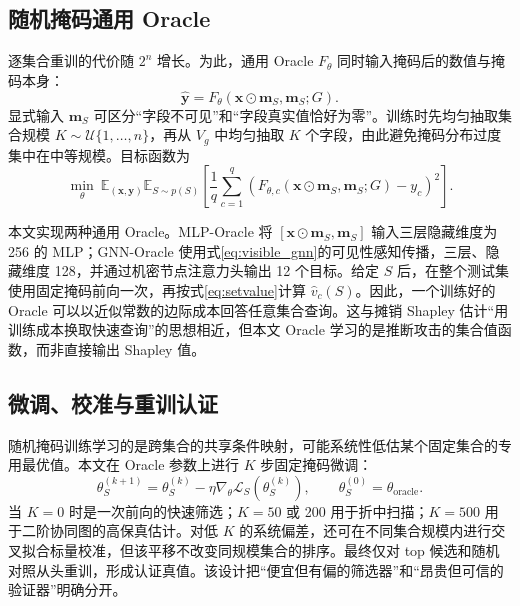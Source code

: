 \documentclass[UTF8,a4paper,zihao=5,fontset=fandol]{ctexart}
\begin{document}
\subsection{随机掩码通用 Oracle}

逐集合重训的代价随 $2^n$ 增长。为此，通用 Oracle $F_\theta$ 同时输入掩码后的数值与掩码本身：
\begin{equation}
  \widehat{\bm y}
  =F_\theta(\bm x\odot\bm m_S,\bm m_S;G).
  \label{eq:oracle}
\end{equation}
显式输入 $\bm m_S$ 可区分“字段不可见”和“字段真实值恰好为零”。训练时先均匀抽取集合规模 $K\sim\mathcal U\{1,\dots,n\}$，再从 $V_g$ 中均匀抽取 $K$ 个字段，由此避免掩码分布过度集中在中等规模。目标函数为
\begin{equation}
  \min_\theta\
  \mathbb E_{(\bm x,\bm y)}
  \mathbb E_{S\sim p(S)}
  \left[
  \frac{1}{q}\sum_{c=1}^{q}
  \left(F_{\theta,c}(\bm x\odot\bm m_S,\bm m_S;G)-y_c\right)^2
  \right].
  \label{eq:masktrain}
\end{equation}

本文实现两种通用 Oracle。MLP-Oracle 将 $[\bm x\odot\bm m_S,\bm m_S]$ 输入三层隐藏维度为 256 的 MLP；GNN-Oracle 使用式\eqref{eq:visible_gnn}的可见性感知传播，三层、隐藏维度 128，并通过机密节点注意力头输出 12 个目标。给定 $S$ 后，在整个测试集使用固定掩码前向一次，再按式\eqref{eq:setvalue}计算 $\widehat v_c(S)$。因此，一个训练好的 Oracle 可以以近似常数的边际成本回答任意集合查询。这与摊销 Shapley 估计“用训练成本换取快速查询”的思想相近\citep{jethani2022fastshap}，但本文 Oracle 学习的是推断攻击的集合值函数，而非直接输出 Shapley 值。

\subsection{微调、校准与重训认证}

随机掩码训练学习的是跨集合的共享条件映射，可能系统性低估某个固定集合的专用最优值。本文在 Oracle 参数上进行 $K$ 步固定掩码微调：
\begin{equation}
  \theta_{S}^{(k+1)}
  =\theta_S^{(k)}-\eta\nabla_{\theta}
  \mathcal L_S(\theta_S^{(k)}),\qquad
  \theta_S^{(0)}=\theta_{\mathrm{oracle}}.
\end{equation}
当 $K=0$ 时是一次前向的快速筛选；$K=50$ 或 200 用于折中扫描；$K=500$ 用于二阶协同图的高保真估计。对低 $K$ 的系统偏差，还可在不同集合规模内进行交叉拟合标量校准，但该平移不改变同规模集合的排序。最终仅对 top 候选和随机对照从头重训，形成认证真值。该设计把“便宜但有偏的筛选器”和“昂贵但可信的验证器”明确分开。
\end{document}
